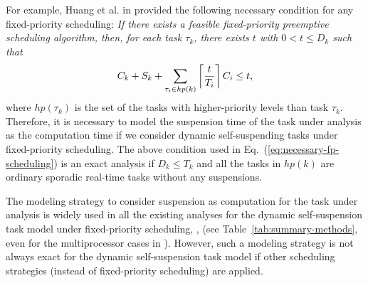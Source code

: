 For example, Huang et al. in \cite[Theorem 3]{huangpass:dac2015} provided the following necessary condition for any fixed-priority scheduling: \emph{ If there exists a feasible fixed-priority preemptive scheduling
  algorithm, then, for each task $\tau_k$, there exists $t$ with $0 < t \leq D_k$ such that}
  \begin{equation}
    \label{eq:necessary-fp-scheduling}
    C_k+S_k + \sum_{\tau_i \in
      hp(k)} \left\lceil{\frac{t}{T_i}}\right\rceil C_i   \leq t,
  \end{equation}
where $hp(\tau_k)$ is the set of the tasks with higher-priority levels than task $\tau_k$. Therefore, it is necessary to model the suspension time of the task under analysis as the computation time if we consider dynamic self-suspending tasks under fixed-priority scheduling. The above condition used in Eq.~(\ref{eq:necessary-fp-scheduling}) is an exact analysis if $D_k \leq T_k$ and all the tasks in $hp(k)$ are ordinary sporadic real-time tasks without any suspensions. 

The modeling strategy to consider suspension as computation for the task under analysis is widely used in all the existing analyses for the dynamic self-suspension task model under fixed-priority scheduling, \eg, \cite{LiuChen:rtss2014,huangpass:dac2015,MingLiRTCSA1994,RTCSA-KimCPKH95,RTAS-AudsleyB04,ECRTS-AudsleyB04,Liu:2000:RS:518501} (see Table~\ref{tab:summary-methods}, even for the multiprocessor cases in \cite{DBLP:conf/ecrts/LiuA13,DBLP:conf/ecrts/LiuCH014}). However, such a modeling strategy is not always exact for the dynamic self-suspension task model if other scheduling strategies (instead of fixed-priority scheduling) are applied.



